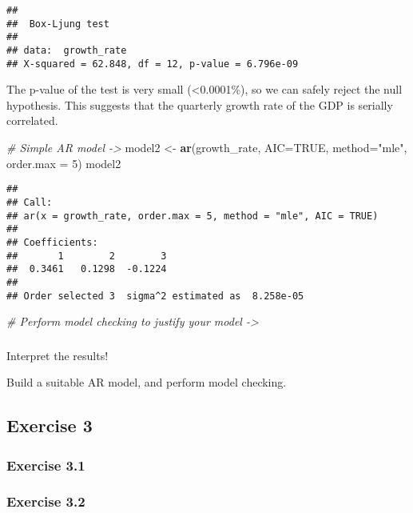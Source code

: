 \documentclass[
]{article}
\newenvironment{Shaded}{\begin{snugshade}}{\end{snugshade}}
\newcommand{\CommentTok}[1]{\textcolor[rgb]{0.56,0.35,0.01}{\textit{#1}}}
\newcommand{\DataTypeTok}[1]{\textcolor[rgb]{0.13,0.29,0.53}{#1}}
\newcommand{\DecValTok}[1]{\textcolor[rgb]{0.00,0.00,0.81}{#1}}
\newcommand{\KeywordTok}[1]{\textcolor[rgb]{0.13,0.29,0.53}{\textbf{#1}}}
\newcommand{\NormalTok}[1]{#1}
\newcommand{\OtherTok}[1]{\textcolor[rgb]{0.56,0.35,0.01}{#1}}
\newcommand{\StringTok}[1]{\textcolor[rgb]{0.31,0.60,0.02}{#1}}
\begin{document}
\begin{verbatim}
## 
##  Box-Ljung test
## 
## data:  growth_rate
## X-squared = 62.848, df = 12, p-value = 6.796e-09
\end{verbatim}

The p-value of the test is very small (\textless0.0001\%), so we can
safely reject the null hypothesis. This suggests that the quarterly
growth rate of the GDP is serially correlated.

\begin{Shaded}
\begin{Highlighting}[]
\CommentTok{# Simple AR model ->}
\NormalTok{model2 <-}\StringTok{ }\KeywordTok{ar}\NormalTok{(growth_rate, }\DataTypeTok{AIC=}\OtherTok{TRUE}\NormalTok{, }\DataTypeTok{method=}\StringTok{"mle"}\NormalTok{, }\DataTypeTok{order.max =} \DecValTok{5}\NormalTok{)}
\NormalTok{model2}
\end{Highlighting}
\end{Shaded}

\begin{verbatim}
## 
## Call:
## ar(x = growth_rate, order.max = 5, method = "mle", AIC = TRUE)
## 
## Coefficients:
##       1        2        3  
##  0.3461   0.1298  -0.1224  
## 
## Order selected 3  sigma^2 estimated as  8.258e-05
\end{verbatim}

\begin{Shaded}
\begin{Highlighting}[]
\CommentTok{# Perform model checking to justify your model ->}
\end{Highlighting}
\end{Shaded}

\hypertarget{section}{%
\subsubsection{}\label{section}}

Interpret the results!

Build a suitable AR model, and perform model checking.

\hypertarget{section-1}{%
\subsubsection{}\label{section-1}}

\hypertarget{exercise-3}{%
\subsection{Exercise 3}\label{exercise-3}}

\hypertarget{exercise-3.1}{%
\subsubsection{Exercise 3.1}\label{exercise-3.1}}

\hypertarget{exercise-3.2}{%
\subsubsection{Exercise 3.2}\label{exercise-3.2}}
\end{document}
